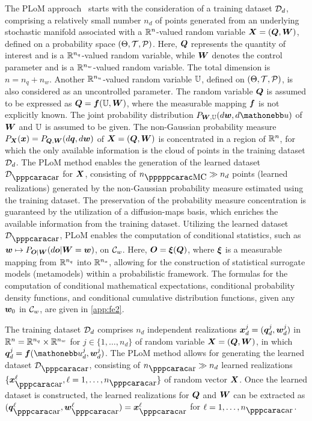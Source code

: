 The PLoM approach~\cite{Soize2016,Soize2020c,Soize2022a} starts with the consideration of a training dataset ${\mathcal{D}}_d$, comprising a relatively small number $n_d$ of points generated from an underlying stochastic manifold associated with a ${\mathbb{R}}^{n}$-valued random variable ${\boldsymbol{X}} = ({\boldsymbol{Q}},{\boldsymbol{W}})$, defined on a probability space $(\Theta,{\mathcal{T}},{\mathcal{P}})$. Here, ${\boldsymbol{Q}}$ represents the quantity of interest and is a ${\mathbb{R}}^{n_q}$-valued random variable, while ${\boldsymbol{W}}$ denotes the control parameter and is a ${\mathbb{R}}^{n_w}$-valued random variable. The total dimension is $n=n_q+n_w$.
%
Another ${\mathbb{R}}^{n_u}$-valued random variable ${\mathbb{U}}$, defined on $(\Theta,{\mathcal{T}},{\mathcal{P}})$, is also considered as an uncontrolled parameter. The random variable ${\boldsymbol{Q}}$ is assumed to be expressed as ${\boldsymbol{Q}} = {\boldsymbol{f}}({\mathbb{U}},{\boldsymbol{W}})$, where the measurable mapping ${\boldsymbol{f}}$ is not explicitly known. The joint probability distribution $P_{\bfW,\UU}(d\bfw,d\uu)$ of  ${\boldsymbol{W}}$ and ${\mathbb{U}}$ is assumed to be given. The non-Gaussian probability measure $P_{{\boldsymbol{X}}}({\boldsymbol{x}}) = P_{{\boldsymbol{Q}},{\boldsymbol{W}}}(d{\boldsymbol{q}},d{\boldsymbol{w}})$ of ${\boldsymbol{X}} =({\boldsymbol{Q}},{\boldsymbol{W}})$ is concentrated in a region of ${\mathbb{R}}^{n}$, for which the only available information is the cloud of points in the training dataset ${\mathcal{D}}_d$. The PLoM method enables the generation of  the learned dataset $\curD_{\ar}$ for ${\boldsymbol{X}}$, consisting of $n_{\pMC} \gg n_d$ points (learned realizations) generated by the non-Gaussian probability measure estimated using the training dataset.
%
The preservation of the probability measure concentration is guaranteed by the utilization of a diffusion-maps basis, which enriches the available information from the training dataset. Utilizing the learned dataset $\curD_\ar$, PLoM enables the computation of conditional statistics, such as ${\boldsymbol{w}}\mapsto P_{{\boldsymbol{O}}\vert {\boldsymbol{W}}}(d{\boldsymbol{o}}\vert{\boldsymbol{W}}={\boldsymbol{w}})$, on ${\mathcal{C}}_w$. Here, ${\boldsymbol{O}} = {\boldsymbol{\xi}}({\boldsymbol{Q}})$, where ${\boldsymbol{\xi}}$ is a measurable mapping from ${\mathbb{R}}^{n_q}$ into ${\mathbb{R}}^{n_o}$, allowing for the construction of statistical surrogate models (metamodels) within a probabilistic framework. The formulas for the computation of conditional mathematical expectations, conditional probability density functions, and conditional cumulative distribution functions, given any ${\boldsymbol{w}}_0$ in ${\mathcal{C}}_w$, are given in \ref{app:fe2}.

The training dataset ${\mathcal{D}}_d$ comprises $n_d$ independent realizations ${\boldsymbol{x}}_d^j= ({\boldsymbol{q}}_d^j,{\boldsymbol{w}}_d^j)$ in ${\mathbb{R}}^{n} = {\mathbb{R}}^{n_q}\times {\mathbb{R}}^{n_w}$ for $j\in\{1,\ldots , n_d\}$ of random variable ${\boldsymbol{X}}=({\boldsymbol{Q}},{\boldsymbol{W}})$, in which $\bfq_d^j= \bff(\uu_d^j,\bfw_d^j)$. The PLoM method allows for generating the learned dataset $\curD_\ar$, consisting of $n_\ar\gg n_d$  learned realizations $\{\bfx_\ar^{\ell},\ell = 1, \ldots ,n_\ar\}$ of random vector ${\boldsymbol{X}}$.
Once the learned dataset is constructed, the learned realizations for ${\boldsymbol{Q}}$ and ${\boldsymbol{W}}$ can be extracted as $(\bfq_\ar^\ell,\bfw_\ar^\ell) = \bfx_\ar^\ell$ for $\ell = 1, \ldots ,n_\ar$.

